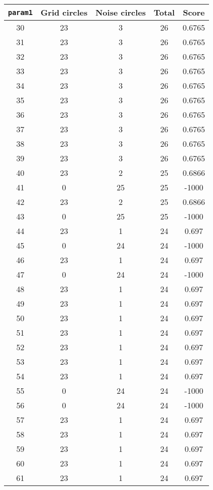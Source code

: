 \documentclass[letterpaper, 12pt]{article}
\begin{document}
\begin{longtable}{|c|c|c|c|c|}
\hline
\textbf{\texttt{param1}} & \textbf{Grid circles} & \textbf{Noise circles} & \textbf{Total} & \textbf{Score} \\
\hline
30 & 23 & 3 & 26 & 0.6765 \\
\hline
31 & 23 & 3 & 26 & 0.6765 \\
\hline
32 & 23 & 3 & 26 & 0.6765 \\
\hline
33 & 23 & 3 & 26 & 0.6765 \\
\hline
34 & 23 & 3 & 26 & 0.6765 \\
\hline
35 & 23 & 3 & 26 & 0.6765 \\
\hline
36 & 23 & 3 & 26 & 0.6765 \\
\hline
37 & 23 & 3 & 26 & 0.6765 \\
\hline
38 & 23 & 3 & 26 & 0.6765 \\
\hline
39 & 23 & 3 & 26 & 0.6765 \\
\hline
40 & 23 & 2 & 25 & 0.6866 \\
\hline
41 & 0 & 25 & 25 & -1000 \\
\hline
42 & 23 & 2 & 25 & 0.6866 \\
\hline
43 & 0 & 25 & 25 & -1000 \\
\hline
44 & 23 & 1 & 24 & 0.697 \\
\hline
45 & 0 & 24 & 24 & -1000 \\
\hline
46 & 23 & 1 & 24 & 0.697 \\
\hline
47 & 0 & 24 & 24 & -1000 \\
\hline
48 & 23 & 1 & 24 & 0.697 \\
\hline
49 & 23 & 1 & 24 & 0.697 \\
\hline
50 & 23 & 1 & 24 & 0.697 \\
\hline
51 & 23 & 1 & 24 & 0.697 \\
\hline
52 & 23 & 1 & 24 & 0.697 \\
\hline
53 & 23 & 1 & 24 & 0.697 \\
\hline
54 & 23 & 1 & 24 & 0.697 \\
\hline
55 & 0 & 24 & 24 & -1000 \\
\hline
56 & 0 & 24 & 24 & -1000 \\
\hline
57 & 23 & 1 & 24 & 0.697 \\
\hline
58 & 23 & 1 & 24 & 0.697 \\
\hline
59 & 23 & 1 & 24 & 0.697 \\
\hline
60 & 23 & 1 & 24 & 0.697 \\
\hline
61 & 23 & 1 & 24 & 0.697 \\

\end{longtable}
\end{document}
